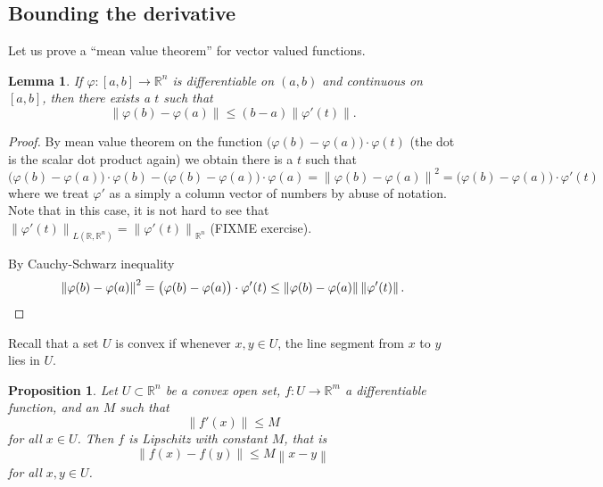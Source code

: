 \documentclass[12pt]{book}
\newcommand{\norm}[1]{\left\lVert {#1} \right\rVert}
\newcommand{\R}{{\mathbb{R}}}
\theoremstyle{plain}
\newtheorem{lemma}[thm]{Lemma}
\newtheorem{prop}[thm]{Proposition}
\theoremstyle{remark}
\theoremstyle{definition}
\theoremstyle{exercise}
\theoremstyle{example}
\begin{document}
\subsection{Bounding the derivative}

Let us prove a ``mean value theorem'' for vector valued functions.

\begin{lemma}
If $\varphi \colon [a,b] \to \R^n$ is differentiable on $(a,b)$ and
continuous on $[a,b]$, then there exists a $t$ such that
\begin{equation*}
\norm{\varphi(b)-\varphi(a)} \leq (b-a) \norm{\varphi'(t)} .
\end{equation*}
\end{lemma}

\begin{proof}
By mean value theorem on the function
$\bigl(\varphi(b)-\varphi(a) \bigr) \cdot \varphi(t)$
(the dot is the scalar dot product again) we obtain
there is a $t$ such that
\begin{equation*}
\bigl(\varphi(b)-\varphi(a) \bigr) \cdot \varphi(b) - 
\bigl(\varphi(b)-\varphi(a) \bigr) \cdot \varphi(a)  = 
\norm{\varphi(b)-\varphi(a)}^2
=
\bigl(\varphi(b)-\varphi(a) \bigr) \cdot \varphi'(t)
\end{equation*}
where we treat $\varphi'$ as a simply a column vector of numbers by abuse of
notation.  Note that
in this case, it is not hard to see that
$\norm{\varphi'(t)}_{L(\R,\R^n)} = \norm{\varphi'(t)}_{\R^n}$ (FIXME exercise).

By Cauchy-Schwarz inequality
\begin{equation*}
\norm{\varphi(b)-\varphi(a)}^2
=
\bigl(\varphi(b)-\varphi(a) \bigr) \cdot \varphi'(t)
\leq
\norm{\varphi(b)-\varphi(a)} \norm{\varphi'(t)} . \qedhere
\end{equation*}
\end{proof}

Recall that a set $U$ is convex
if whenever $x,y \in U$, the line segment from
$x$ to $y$ lies in $U$.

\begin{prop} \label{mv:prop:convexlip}
Let $U \subset \R^n$ be a convex open set, $f \colon U \to \R^m$
a differentiable function, and an $M$ such that
\begin{equation*}
\norm{f'(x)} \leq M
\end{equation*}
for all $x \in U$.  Then $f$ is Lipschitz with constant $M$, that is
\begin{equation*}
\norm{f(x)-f(y)} \leq M \norm{x-y}
\end{equation*}
for all $x,y \in U$.
\end{prop}
\end{document}
